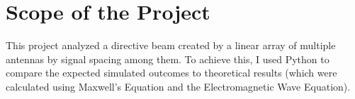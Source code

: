 \section{Scope of the Project}

This project analyzed a directive beam created by a linear array of multiple antennas by signal spacing among them. 
To achieve this, I used Python to compare the expected simulated outcomes to theoretical results (which were calculated using Maxwell's Equation and the Electromagnetic Wave Equation).

